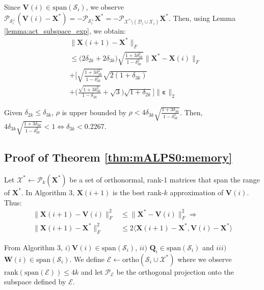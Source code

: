 \documentclass[twocolumn]{svjour3}
\newcommand{\vectornormbig}[1]{\big\|#1\big\|}
\newcommand{\signal}{\boldsymbol{X}}
\newcommand{\bestsignal}{\boldsymbol{X}^\ast}
\newcommand{\noise}{\boldsymbol{\varepsilon}}
\newcommand{\rank}{k}
\begin{document}
Since $ \boldsymbol{V}(i) \in \text{span}(\mathcal{S}_i) $, we observe $ \mathcal{P}_{\mathcal{S}_i^{\bot}}(\boldsymbol{V}(i) - \bestsignal) = -\mathcal{P}_{\mathcal{S}_i^{\bot}} \bestsignal = -\mathcal{P}_{\mathcal{X}^\ast \setminus (\mathcal{D}_i \cup \mathcal{X}_i)} \bestsignal $. Then, using Lemma \ref{lemma:act_subspace_exp}, we obtain:
\begin{align}
&\vectornormbig{\signal(i+1) - \bestsignal}_F \nonumber \\ 
&\leq \big(2\delta_{2\rank} + 2\delta_{3\rank}\big)\sqrt{\frac{1+3\delta_{3\rank}^2}{1-\delta_{3\rank}^2}}  \vectornormbig{\bestsignal - \signal(i)}_F \nonumber \\ &+ \Bigg[\sqrt{\frac{1+3\delta_{3\rank}^2}{1-\delta_{3\rank}^2}} \sqrt{2(1+\delta_{3\rank})} \nonumber \\ &+ \Big(\frac{\sqrt{1+3\delta_{3\rank}^2}}{1-\delta_{3\rank}} + \sqrt{3}\Big)\sqrt{1+\delta_{2\rank}}\Bigg] \vectornormbig{\noise}_2
\end{align}

Given $ \delta_{2\rank} \leq \delta_{3\rank} $, $ \rho $ is upper bounded by $\rho < 4\delta_{3\rank}\sqrt{\frac{1+3\delta_{3\rank}}{1-\delta_{3\rank}^2}} $. Then, $4\delta_{3\rank}\sqrt{\frac{1+3\delta_{3\rank}}{1-\delta_{3\rank}^2}} < 1 \Leftrightarrow \delta_{3\rank} < 0.2267.$




\subsection{Proof of Theorem \ref{thm:mALPS0:memory}}

Let $ \mathcal{X}^\ast \leftarrow \mathcal{P}_{\rank}(\bestsignal) $ be a set of orthonormal, rank-1 matrices that span the range of $ \bestsignal $. In Algorithm 3, $ \signal(i+1) $ is the best rank-$ \rank $ approximation of $ \boldsymbol{V}(i) $. Thus:
\begin{align}
\vectornormbig{\signal(i+1) - \boldsymbol{V}(i)}_F^2 &\leq \vectornormbig{\bestsignal - \boldsymbol{V}(i)}_F^2 \Rightarrow \nonumber \\
\vectornormbig{\signal(i+1) - \bestsignal}_F^2 &\leq 2\langle \signal(i+1) - \bestsignal, \boldsymbol{V}(i) - \bestsignal \rangle \label{eq:mALPS0_memory:00}
\end{align}

From Algorithm 3, $ i) ~\boldsymbol{V}(i) \in \text{span}(\mathcal{S}_i) $, $ ii) $ $ \boldsymbol{Q}_i \in \text{span}( \mathcal{S}_i) $ and $ iii) $ $ \boldsymbol{W}(i) \in \text{span}(\mathcal{S}_i) $. We define $ \mathcal{E} \leftarrow \text{ortho}(\mathcal{S}_i \cup \mathcal{X}^{\ast}) $ where we observe $ \text{rank}(\text{span}(\mathcal{E})) \leq 4\rank $ and let $ \mathcal{P}_{\mathcal{E}} $ be the orthogonal projection onto the subspace defined by $ \mathcal{E} $. 
\end{document}
